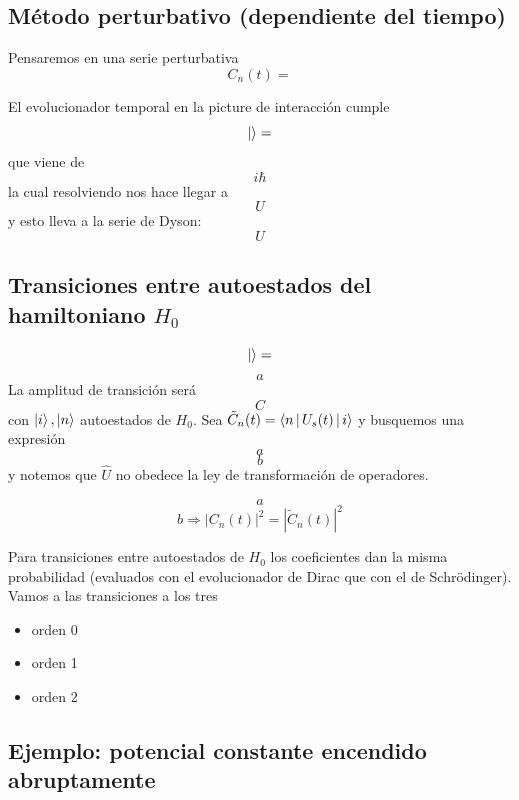 \documentclass[10pt,oneside]{CBFT_book}
\begin{document}
\subsection{Método perturbativo (dependiente del tiempo)}

Pensaremos en una serie perturbativa 
\[
	C_n(t) =
\]

El evolucionador temporal en la picture de interacción cumple 
\[
	\Ket{} =
\]
que viene de  
\[
	i\hbar
\]
la cual resolviendo nos hace llegar a 
\[
	U
\]
y esto lleva a la serie de Dyson:
\[
	U
\]

\subsection{Transiciones entre autoestados del hamiltoniano $H_0$}
\[
	\Ket{} =
\]
\[
	a
\]
La amplitud de transición será 
\[
	C
\]
con $\Ket{i},\Ket{n}$ autoestados de $H_0$.
Sea $\tilde{C}_n(t)=\Braket{n|U_s(t)|i}$ y busquemos una expresión 
\[
	a
\]
\[
	b
\]
y notemos que $\hat{U}$ no obedece la ley de transformación de operadores.

\[
	a
\]
\[
	b \Rightarrow |C_n(t)|^2 = |\tilde{C}_n(t)|^2
\]

Para transiciones entre autoestados de $H_0$ los coeficientes dan la misma probabilidad (evaluados con el 
evolucionador de Dirac que con el de Schrödinger).
Vamos a las transiciones a los tres 
\begin{itemize}
 \item orden 0
 \item orden 1
 \item orden 2
\end{itemize}

\subsection{Ejemplo: potencial constante encendido abruptamente}
\end{document}
